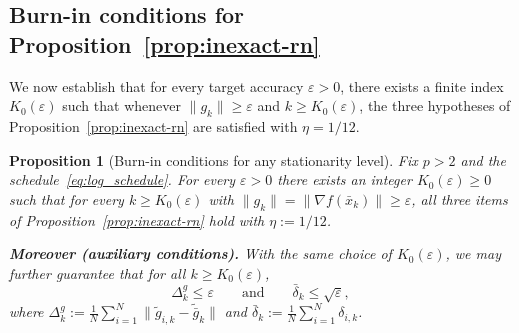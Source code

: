 \documentclass[11pt,a4paper]{article}
\newtheorem{proposition}[theorem]{Proposition}
\begin{document}
\subsection{Burn-in conditions for Proposition~\ref{prop:inexact-rn}}

We now establish that for every target accuracy $\varepsilon>0$, there
exists a finite index $K_0(\varepsilon)$ such that whenever
$\|g_k\|\ge\varepsilon$ and $k\ge K_0(\varepsilon)$,
the three hypotheses of Proposition~\ref{prop:inexact-rn} are
satisfied with $\eta=1/12$.
\begin{proposition}[Burn-in conditions for any stationarity level]\label{prop:burnin}
Fix $p>2$ and the schedule~\eqref{eq:log_schedule}.
For every $\varepsilon>0$ there exists an integer $K_0(\varepsilon)\ge0$ such that
for every $k\ge K_0(\varepsilon)$ with $\|g_k\|=\|\nabla f(\bar x_k)\|\ge \varepsilon$,
all three items of Proposition~\ref{prop:inexact-rn} hold with $\eta:=1/12$.

\smallskip
\noindent\textbf{Moreover (auxiliary conditions).}
With the same choice of $K_0(\varepsilon)$, we may further guarantee that for all $k\ge K_0(\varepsilon)$,
\begin{equation}\label{eq:burnin_aux_enforce}
\Delta_k^g \le \varepsilon
\qquad\text{and}\qquad
\bar\delta_k \le \sqrt{\varepsilon},
\end{equation}
where $\Delta_k^g:=\frac1N\sum_{i=1}^N\|\tilde g_{i,k}-\tilde{\bar g}_k\|$ and $\bar\delta_k:=\frac1N\sum_{i=1}^N\delta_{i,k}$.
\end{proposition}
\end{document}
